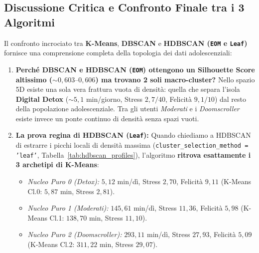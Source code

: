 \subsection{Discussione Critica e Confronto Finale tra i 3 Algoritmi}

Il confronto incrociato tra \textbf{K-Means}, \textbf{DBSCAN} e \textbf{HDBSCAN (\texttt{EOM} e \texttt{Leaf})} fornisce una comprensione completa della topologia dei dati adolescenziali:
\begin{enumerate}
    \item \textbf{Perché DBSCAN e HDBSCAN (\texttt{EOM}) ottengono un Silhouette Score altissimo ($\sim 0,603\text{--}0,606$) ma trovano 2 soli macro-cluster?} Nello spazio 5D esiste una sola vera frattura vuota di densità: quella che separa l'isola \textbf{Digital Detox} ($\sim 5,1$ min/giorno, Stress $2,7/40$, Felicità $9,1/10$) dal resto della popolazione adolescenziale. Tra gli utenti \emph{Moderati} e i \emph{Doomscroller} esiste invece un ponte continuo di densità senza spazi vuoti.
    \item \textbf{La prova regina di HDBSCAN (\texttt{Leaf}):} Quando chiediamo a HDBSCAN di estrarre i picchi locali di densità massima (\texttt{cluster\_selection\_method = 'leaf'}, Tabella~\ref{tab:hdbscan_profiles}), l'algoritmo \textbf{ritrova esattamente i 3 archetipi di K-Means}:
    \begin{itemize}
        \item \emph{Nucleo Puro 0 (Detox):} $5,12$ min/dì, Stress \textbf{$2,70$}, Felicità \textbf{$9,11$} (K-Means Cl.0: $5,87$ min, Stress $2,81$).
        \item \emph{Nucleo Puro 1 (Moderati):} $145,61$ min/dì, Stress \textbf{$11,36$}, Felicità \textbf{$5,98$} (K-Means Cl.1: $138,70$ min, Stress $11,10$).
        \item \emph{Nucleo Puro 2 (Doomscroller):} $293,11$ min/dì, Stress \textbf{$27,93$}, Felicità \textbf{$5,09$} (K-Means Cl.2: $311,22$ min, Stress $29,07$).
    \end{itemize}
\end{enumerate}

